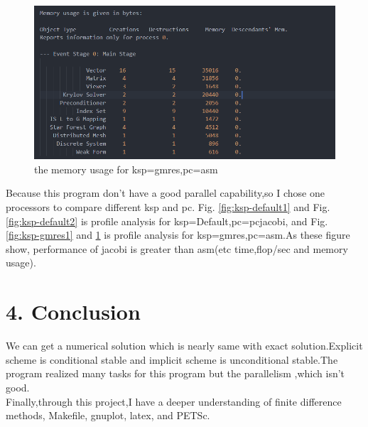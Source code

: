 \documentclass[12pt]{article}
\begin{document}
\begin{figure}
    \centering
    \includegraphics[scale=0.8]{img/ksp-germs2.png}
    \caption{the memory usage for ksp=gmres,pc=asm}
    \label{fig:ksp-gmres2}
\end{figure}


Because this program don't have a good parallel capability,so I chose one processors to compare different ksp and pc. Fig. \ref{fig:ksp-default1} and Fig. \ref{fig:ksp-default2} is profile analysis for ksp=Default,pc=pcjacobi, and Fig. \ref{fig:ksp-gmres1} and \ref{fig:ksp-gmres2} is profile analysis for ksp=gmres,pc=asm.As these figure show, performance of  jacobi is greater than asm(etc time,flop/sec and memory usage).



\section*{4. Conclusion}
We can get a numerical solution which is nearly same with exact solution.Explicit scheme is conditional stable and implicit scheme is unconditional stable.The program realized many tasks for this program but the parallelism ,which isn't good.\\
Finally,through this project,I have a deeper understanding of finite difference methods, Makefile, gnuplot, latex, and PETSc.
\end{document}

